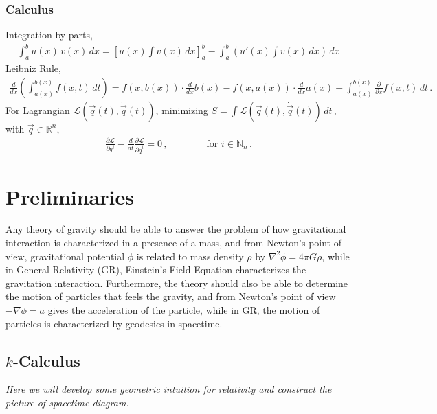 \documentclass[11pt, onesided]{book}
\theoremstyle{break}
\theoremstyle{break}
\newcommand{\R}{\mathbb{R}}
\newcommand{\N}{\mathbb{N}}
\newcommand{\pd}{\partial}
\begin{document}
\subsection*{Calculus}
Integration by parts,
\begin{align*}
\int_a^b u(x)\,v(x)\, dx = \left[u(x)\int v(x) \, dx\right]_a^b - \int_a^b \left(u'(x)\int v(x)\, dx \right)\,dx
\end{align*}
Leibniz Rule,
\begin{align*}
\frac{d}{dx}\left(\int_{a(x)}^{b(x)}
f(x,t) \, dt
\right) = f(x,b(x)) \cdot \frac{d}{dx}b(x) - f(x,a(x)) \cdot \frac{d}{dx}a(x) + \int_{a(x)}^{b(x)}\frac{\pd}{\pd x}f(x,t)\, dt\,.
\end{align*}
For Lagrangian $\mathcal{L}(\vec{q}(t),\dot{\vec{q}}(t))$, minimizing $S = \int \mathcal{L}(\vec{q}(t),\dot{\vec{q}}(t))\, dt\, $, with $\vec{q}\in \R^n$,
\begin{align*}
\frac{\pd \mathcal{L}}{\pd q^i} - \frac{d}{dt}\frac{\pd \mathcal{L}}{\pd \dot{q}^i} = 0\,,\qquad\qquad\text{for }i\in \N_n\,.
\end{align*}


\newpage
\chapter{Preliminaries}
\quad Any theory of gravity should be able to answer the problem of how gravitational interaction is characterized in a presence of a mass, and from Newton's point of view, gravitational potential $\phi$ is related to mass density $\rho$ by $\nabla^2 \phi = 4\pi G\rho$, while in General Relativity (GR), Einstein's Field Equation characterizes the gravitation interaction. Furthermore, the theory should also be able to determine the motion of particles that feels the gravity, and from Newton's point of view $-\nabla \phi = a$ gives the acceleration of the particle, while in GR, the motion of particles is characterized by geodesics in spacetime. 

\section[$k$-Calculus]{\color{red}$k$-Calculus\color{black}}
\textit{Here we will develop some geometric intuition for relativity and construct the picture of spacetime diagram.} \\
\end{document}
